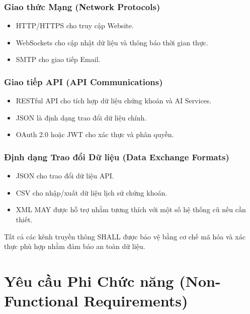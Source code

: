 \documentclass[12pt, a4paper]{article}
\begin{document}
\subsubsection{Giao thức Mạng (Network Protocols)}
\begin{itemize}
    \item HTTP/HTTPS cho truy cập Website.

    \item WebSockets cho cập nhật dữ liệu và thông báo thời gian thực.

    \item SMTP cho giao tiếp Email.
\end{itemize}


\subsubsection{Giao tiếp API (API Communications)}
\begin{itemize}
    \item RESTful API cho tích hợp dữ liệu chứng khoán và AI Services.

    \item JSON là định dạng trao đổi dữ liệu chính.

    \item OAuth 2.0 hoặc JWT cho xác thực và phân quyền.
\end{itemize}


\subsubsection{Định dạng Trao đổi Dữ liệu (Data Exchange Formats)}
\begin{itemize}
    \item JSON cho trao đổi dữ liệu API.

    \item CSV cho nhập/xuất dữ liệu lịch sử chứng khoán.

    \item XML MAY được hỗ trợ nhằm tương thích với một số hệ thống cũ nếu cần thiết.
\end{itemize}

Tất cả các kênh truyền thông SHALL được bảo vệ bằng cơ chế mã hóa và xác thực phù hợp nhằm đảm bảo an toàn dữ liệu.
\section{Yêu cầu Phi Chức năng (Non-Functional Requirements)}
\end{document}
